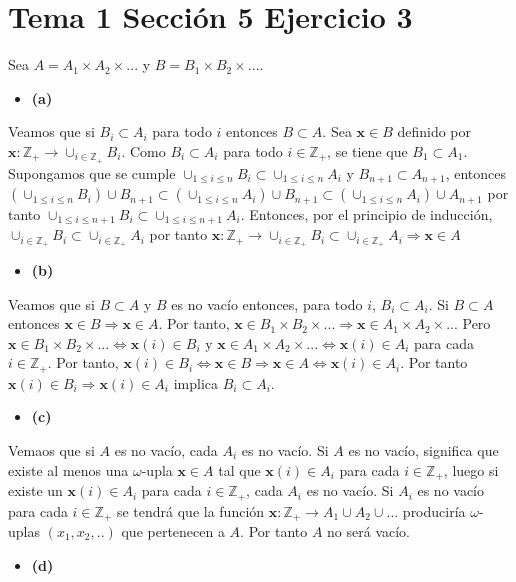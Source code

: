 \documentclass{article}
\newcommand{\vect}[1]{\boldsymbol{#1}}
\begin{document}
\section{Tema 1 Sección 5 Ejercicio 3}

Sea $A=A_1 \times A_2 \times ...$ y $B=B_1 \times B_2 \times ...$. \begin{itemize}
\item \bf (a) \rm
\end{itemize}
Veamos que si $B_i\subset A_i$ para todo $i$ entonces $B \subset A$. Sea $\vect{x}\in B$ definido por $\vect{x}:\mathbb{Z}_{+}\rightarrow \cup_{i\in \mathbb{Z}_{+}} B_i$. Como $B_i \subset A_i$ para todo $i\in \mathbb{Z}_{+}$, se tiene que $B_1\subset A_1$. Supongamos que se cumple $\cup_{1\leq i \leq n} B_i\subset \cup_{1\leq i \leq n} A_i$ y $B_{n+1}\subset A_{n+1}$, entonces $(\cup_{1\leq i \leq n} B_i)\cup B_{n+1}\subset (\cup_{1\leq i \leq n} A_i)\cup B_{n+1}\subset (\cup_{1\leq i \leq n} A_i)\cup A_{n+1}$ por tanto $\cup_{1\leq i \leq n+1} B_i\subset \cup_{1\leq i \leq n+1} A_i$. Entonces, por el principio de inducción, $\cup_{i\in\mathbb{Z}_{+}} B_i\subset \cup_{i\in\mathbb{Z}_{+}} A_i$ por tanto $\vect{x}:\mathbb{Z}_{+}\rightarrow \cup_{i\in \mathbb{Z}_{+}} B_i\subset \cup_{i\in \mathbb{Z}_{+}} A_i\Rightarrow \vect{x}\in A$
\begin{itemize}
\item \bf (b) \rm
\end{itemize}
Veamos que si $B\subset A$ y $B$ es no vacío entonces, para todo $i$, $B_i\subset A_i$. Si $B\subset A$ entonces $\vect{x}\in B\Rightarrow \vect{x}\in A$. Por tanto, $\vect{x}\in B_1\times B_2\times ...\Rightarrow \vect{x}\in A_1 \times A_2 \times ...$  Pero $\vect{x}\in B_1\times B_2\times ... \Leftrightarrow \vect{x}(i)\in B_i$ y $\vect{x}\in A_1\times A_2\times ... \Leftrightarrow \vect{x}(i)\in A_i$  para cada $i\in\mathbb{Z}_{+}$. Por tanto, $\vect{x}(i)\in B_i \Leftrightarrow \vect{x}\in B \Rightarrow \vect{x}\in A \Leftrightarrow \vect{x}(i)\in A_i$. Por tanto $\vect{x}(i)\in B_i \Rightarrow  \vect{x}(i)\in A_i$ implica $B_i\subset A_i$.
\begin{itemize}
\item \bf (c) \rm
\end{itemize}
Vemaos que si $A$ es no vacío, cada $A_i$ es no vacío. Si $A$ es no vacío, significa que existe al menos una $\omega$-upla $\vect{x}\in A$ tal que $\vect{x}(i)\in A_i$ para cada $i\in \mathbb{Z}_{+}$, luego si existe un $\vect{x}(i)\in A_i$ para cada $i\in \mathbb{Z}_{+}$, cada $A_i$ es no vacío. Si $A_i$ es no vacío para cada $i\in \mathbb{Z}_{+}$ se tendrá que la función $\vect{x}:\mathbb{Z}_{+}\rightarrow A_1\cup A_{2}\cup...$ produciría $\omega$-uplas $(x_1,x_2,..)$ que pertenecen a $A$. Por tanto $A$ no será vacío.\begin{itemize}
\item \bf (d) \rm
\end{itemize}
\end{document}
